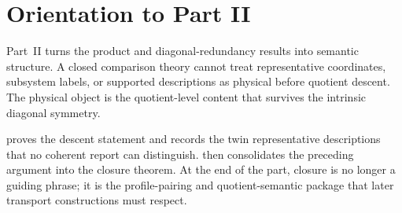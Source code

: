 \chapter*{Orientation to Part II}
\label{part:intro-quotient}
\begin{chapterorientation}
\end{chapterorientation}

Part~II turns the product and diagonal-redundancy results into semantic
structure.  A closed comparison theory cannot treat representative
coordinates, subsystem labels, or supported descriptions as physical
before quotient descent.  The physical object is the quotient-level
content that survives the intrinsic diagonal symmetry.

 proves the descent statement and records the twin
representative descriptions that no coherent report can distinguish.
 then consolidates the preceding argument into the
closure theorem.  At the end of the part, closure is no longer a
guiding phrase; it is the profile-pairing and quotient-semantic package
that later transport constructions must respect.
